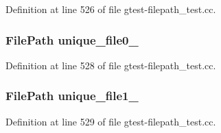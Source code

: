 Definition at line 526 of file gtest-\/filepath\+\_\+test.\+cc.

\subsubsection[{\texorpdfstring{unique\+\_\+file0\+\_\+}{unique_file0_}}]{\setlength{\rightskip}{0pt plus 5cm}File\+Path unique\+\_\+file0\+\_\+\hspace{0.3cm}{\ttfamily [protected]}}\hypertarget{gtest-filepath__test_8cc_adcfc0d513af262b152f09de5a6094636}{}\label{gtest-filepath__test_8cc_adcfc0d513af262b152f09de5a6094636}


Definition at line 528 of file gtest-\/filepath\+\_\+test.\+cc.

\subsubsection[{\texorpdfstring{unique\+\_\+file1\+\_\+}{unique_file1_}}]{\setlength{\rightskip}{0pt plus 5cm}File\+Path unique\+\_\+file1\+\_\+\hspace{0.3cm}{\ttfamily [protected]}}\hypertarget{gtest-filepath__test_8cc_a2a86ee575545592eb81059360eda7379}{}\label{gtest-filepath__test_8cc_a2a86ee575545592eb81059360eda7379}


Definition at line 529 of file gtest-\/filepath\+\_\+test.\+cc.


